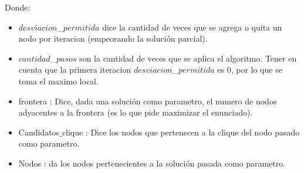 Donde:
\begin{itemize}
 \item $desviacion$\_$permitida$ dice la cantidad de veces que se agrega o quita un nodo por iteracion (empeorando la solución parcial).
 \item $cantidad$\_$pasos$ son la cantidad de veces que se aplica el algoritmo. Tener en cuenta que la primera iteracion $desviacion$\_$permitida$ es 0, por lo que se toma el maximo local.
 \item frontera : Dice, dada una solución como parametro, el numero de nodos adyacentes a la frontera (es lo que pide maximizar el enunciado).
 \item Candidatos$\_$clique : Dice los nodos que pertenecen a la clique del nodo pasado como parametro.
 \item Nodos : da los nodos pertenecientes a la solución pasada como parametro.
\end{itemize}
